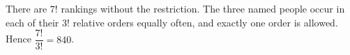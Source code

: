 There are $7!$ rankings without the restriction. The three named people occur in each of their $3!$ relative orders equally often, and exactly one order is allowed. Hence $\boxed{\dfrac{7!}{3!}=840}$.
